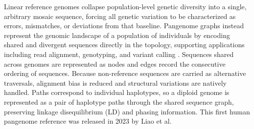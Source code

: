%
%
%

Linear reference genomes collapse population-level genetic diversity into a single, arbitrary mosaic sequence, forcing all genetic variation to be characterized as errors, mismatches, or deviations from that baseline. Pangenome graphs instead represent the genomic landscape of a population of individuals by encoding shared and divergent sequences directly in the topology, supporting applications including read alignment, genotyping, and variant calling \cite{eizenga2020}. Sequences shared across genomes are represented as nodes and edges record the consecutive ordering of sequences.
Because non-reference sequences are carried as alternative traversals, alignment bias is reduced and structural variations are natively handled. Paths correspond to individual haplotypes, so a diploid genome is represented as a pair of haplotype paths through the shared sequence graph, preserving linkage disequilibrium (LD) and phasing information. This first human pangenome reference was released in 2023 by Liao et al.

